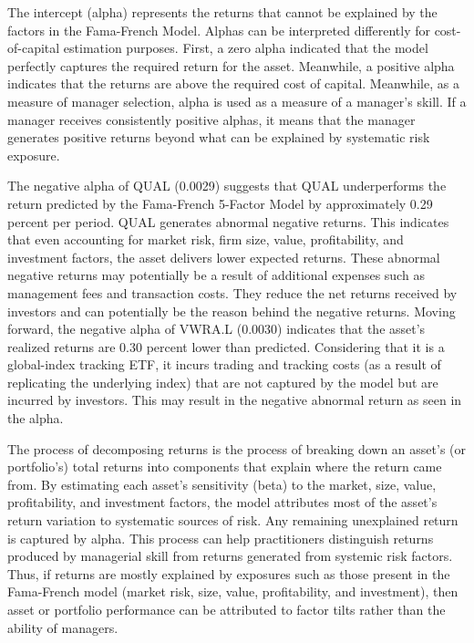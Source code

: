 \documentclass[12pt]{article}
\begin{document}
The intercept (alpha) represents the returns that cannot be explained by the factors in the Fama-French Model. Alphas can be interpreted differently for cost-of-capital estimation purposes. First, a zero alpha indicated that the model perfectly captures the required return for the asset. Meanwhile, a positive alpha indicates that the returns are above the required cost of capital. Meanwhile, as a measure of manager selection, alpha is used as a measure of a manager’s skill. If a manager receives consistently positive alphas, it means that the manager generates positive returns beyond what can be explained by systematic risk exposure.


The negative alpha of QUAL (0.0029) suggests that QUAL underperforms the return predicted by the Fama-French 5-Factor Model by approximately 0.29 percent per period. QUAL generates abnormal negative returns. This indicates that even accounting for market risk, firm size, value, profitability, and investment factors, the asset delivers lower expected returns. These abnormal negative returns may potentially be a result of additional expenses such as management fees and transaction costs. They reduce the net returns received by investors and can potentially be the reason behind the negative returns. Moving forward, the negative alpha of VWRA.L (0.0030) indicates that the asset’s realized returns are 0.30 percent lower than predicted. Considering that it is a global-index tracking ETF, it incurs trading and tracking costs (as a result of replicating the underlying index) that are not captured by the model but are incurred by investors. This may result in the negative abnormal return as seen in the alpha.

The process of decomposing returns is the process of breaking down an asset's (or portfolio’s) total returns into components that explain where the return came from.  By estimating each asset’s sensitivity (beta) to the market, size, value, profitability, and investment factors, the model attributes most of the asset’s return variation to systematic sources of risk. Any remaining unexplained return is captured by alpha. This process can help practitioners distinguish returns produced by managerial skill from returns generated from systemic risk factors. Thus, if returns are mostly explained by exposures such as those present in the Fama-French model (market risk, size, value, profitability, and investment), then asset or portfolio performance can be attributed to factor tilts rather than the ability of managers.
\end{document}

